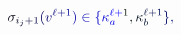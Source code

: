 \documentclass[12pt]{article}
\begin{document}
\makeatletter
\renewcommand*{\@textcolor}[3]{%
  \protect\leavevmode
  \begingroup
    \color#1{#2}#3%
  \endgroup
}
\makeatother
\begin{displaymath}
\mathcolor[RGB]{0,0,15}{\sigma} _ { \mathcolor[RGB]{0,0,30}{i} _ { \mathcolor[RGB]{0,0,45}{j} } \mathcolor[RGB]{0,0,60}{+} \mathcolor[RGB]{0,0,75}{1} } \mathcolor[RGB]{0,0,90}{(} \mathcolor[RGB]{0,0,105}{v} ^ { \mathcolor[RGB]{0,0,120}{\ell} \mathcolor[RGB]{0,0,135}{+} \mathcolor[RGB]{0,0,150}{1} } \mathcolor[RGB]{0,0,165}{)} \mathcolor[RGB]{0,0,180}{\in} \mathcolor[RGB]{0,0,195}{\{} \mathcolor[RGB]{0,0,210}{\kappa} _ { \mathcolor[RGB]{0,0,225}{a} } ^ { \mathcolor[RGB]{0,0,240}{\ell} \mathcolor[RGB]{0,0,255}{+} \mathcolor[RGB]{0,15,0}{1} } \mathcolor[RGB]{0,15,15}{,} \mathcolor[RGB]{0,15,30}{\kappa} _ { \mathcolor[RGB]{0,15,45}{b} } ^ { \mathcolor[RGB]{0,15,60}{\ell} \mathcolor[RGB]{0,15,75}{+} \mathcolor[RGB]{0,15,90}{1} } \mathcolor[RGB]{0,15,105}{\}} \mathcolor[RGB]{0,15,120}{,}
\end{displaymath}
\end{document}
